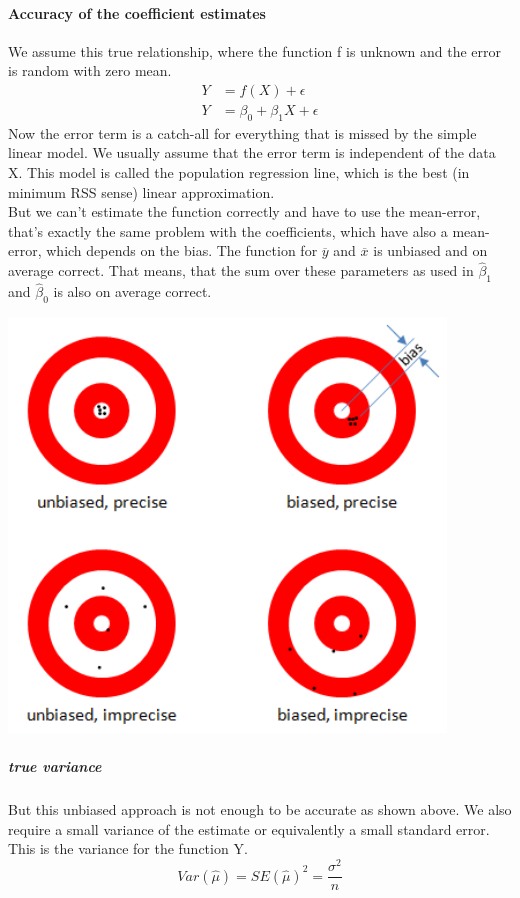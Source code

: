 \documentclass[../document.tex]{subfiles}
\begin{document}
	\paragraph{Accuracy of the coefficient estimates}
	We assume this true relationship, where the function f is unknown and the error is random with zero mean.
	\begin{equation}
	\begin{split}
		Y &= f(X) + \epsilon\\
		Y &= \beta_{0} + \beta_{1}X+\epsilon
	\end{split}
	\end{equation}
	Now the error term is a catch-all for everything that is missed by the simple linear model. We usually assume that the error term is independent of the data X. This model is called the population regression line, which is the best (in minimum RSS sense) linear approximation.\\
	But we can't estimate the function correctly and have to use the mean-error, that's exactly the same problem with the coefficients, which have also a mean-error, which depends on the bias.
	The function for \(\overline{y}\) and \(\overline{x}\) is unbiased and on average correct. That means, that the sum over these parameters as used in \(\hat{\beta}_{1}\) and \(\hat{\beta}_{0}\) is also on average correct.
	\begin{center}
		\includegraphics[width=.6\textwidth]{pictures/bias_precision.png}
	\end{center}
	\subparagraph{true variance}
	But this unbiased approach is not enough to be accurate as shown above.
	We also require a small variance of the estimate or equivalently a small standard error. This is the variance for the function Y.
	\begin{equation}
		Var(\hat{\mu})=SE(\hat{\mu})^2=\frac{\sigma^2}{n}
	\end{equation}
\end{document}
